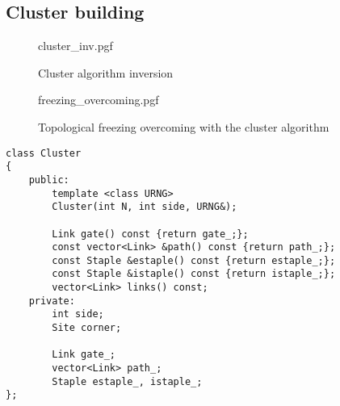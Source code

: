 \subsection*{Cluster building}

\begin{figure}[!htb]
    \centering
    {cluster_inv.pgf}
    \caption{Cluster algorithm inversion}
    \label{fig:cluster_inv}
\end{figure}

\begin{figure}[!htb]
    \centering
    {freezing_overcoming.pgf}
    \caption{Topological freezing overcoming with the cluster algorithm}
    \label{fig:freezing_overcoming}
\end{figure}

\begin{lstlisting}[caption={Cluster class declaration}]
class Cluster
{
    public:
        template <class URNG>
        Cluster(int N, int side, URNG&);

        Link gate() const {return gate_;};
        const vector<Link> &path() const {return path_;};
        const Staple &estaple() const {return estaple_;};
        const Staple &istaple() const {return istaple_;};
        vector<Link> links() const;
    private:
        int side;
        Site corner;

        Link gate_;
        vector<Link> path_;
        Staple estaple_, istaple_;
};
\end{lstlisting}

